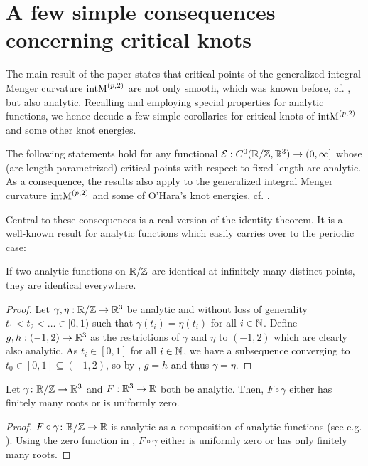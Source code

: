 \section{A few simple consequences concerning critical knots}
\label{sec:Consequences}

The main result of the paper states that critical points of the generalized integral Menger curvature $\operatorname{intM}^{\left(p,2\right)}$ are not only smooth, which was known before, cf. \cite[Theorem\,4]{BlattReiter:2015:Menger}, but also analytic. Recalling and employing special properties for analytic functions, we hence decude a few simple corollaries for critical knots of $\operatorname{intM}^{\left(p,2\right)}$ and some other knot energies.

The following statements hold for any functional $\mathcal{E}: C^0(\mathbb{R}/\mathbb{Z},\mathbb{R}^3) \rightarrow (0,\infty]$ whose (arc-length parametrized) critical points with respect to fixed length are analytic. As a consequence, the results also apply to the generalized integral Menger curvature $\operatorname{intM}^{\left(p,2\right)}$ and some of O'Hara's knot energies, cf. \cite{BlattVorderobermeier:2019:CriticalMoebius,Vorderobermeier:2019:CriticalOHara}.

Central to these consequences is a real version of the identity theorem. It is a well-known result for analytic functions which easily carries over to the periodic case:
\begin{proposition}
\label{propositionRealIdentityTheorem}
    If two analytic functions on $\mathbb{R}/\mathbb{Z}$ are identical at infinitely many distinct points, they are identical everywhere.
\end{proposition}
\begin{proof}
    Let $\gamma,\eta : \mathbb{R}/\mathbb{Z} \to \mathbb{R}^3$ be analytic and without loss of generality $t_1<t_2< \ldots \in [0,1)$ such that $\gamma(t_i)=\eta(t_i)$ for all $i \in \mathbb{N}$.
    Define $g,h: (-1,2) \to \mathbb{R}^3$ as the restrictions of $\gamma$ and $\eta$ to $(-1,2)$ which are clearly also analytic.
    As $t_i \in [0,1]$ for all $i \in \mathbb{N}$, we have a subsequence converging to $t_0 \in [0,1]\subseteq(-1,2)$, so by \cite[Corollary~1.2.7]{KrantzParks:2002:Aprimerofrealanalyticfunctions}, $g=h$ and thus $\gamma = \eta$.
\end{proof}

\begin{lemma}
    \label{lemma:zerosAnalyticFunctions}
    Let $\gamma \colon \mathbb{R}/\mathbb{Z} \to \mathbb{R}^3$ and $F: \mathbb{R}^3 \to \mathbb{R}$ both be analytic. Then, $F\circ \gamma$  either has finitely many roots or is uniformly zero.
\end{lemma}
\begin{proof}
    $F \circ \gamma \colon \mathbb{R}/\mathbb{Z} \to \mathbb{R}$ is analytic as a composition of analytic functions (see e.g. \cite[Proposition~2.2.8]{KrantzParks:2002:Aprimerofrealanalyticfunctions}).
    Using the zero function in , $F\circ \gamma$ either is uniformly zero or has only finitely many roots.
\end{proof}

